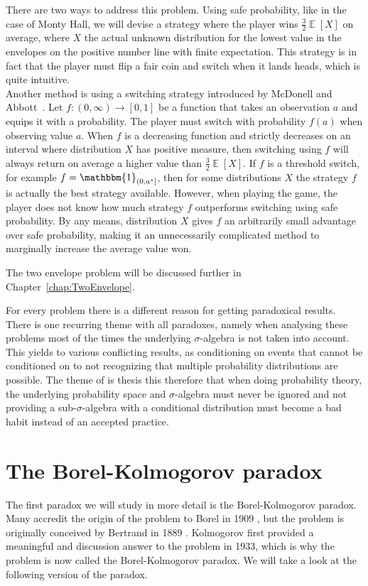 \documentclass[a4paper]{report}
\theoremstyle{plain}
\theoremstyle{definition}
\theoremstyle{remark}
\numberwithin{equation}{chapter}
\DeclareMathOperator{\E}{\mathbb{E}}
\DeclareMathOperator{\1}{\mathbbm{1}}
\begin{document}
There are two ways to address this problem. Using safe probability, like in the case of Monty Hall, we will devise a strategy where the player wins $\frac{3}{2}\E[X]$ on average, where $X$ the actual unknown distribution for the lowest value in the envelopes on the positive number line with finite expectation. This strategy is in fact that the player must flip a fair coin and switch when it lands heads, which is quite intuitive.\\
Another method is using a switching strategy introduced by McDonell and Abbott~\cite{McDonnell09,Abbott10,McDonnell11}. Let $f\colon (0,\infty)\to[0,1]$ be a function that takes an observation $a$ and equips it with a probability. The player must switch with probability $f(a)$ when observing value $a$. When $f$ is a decreasing function and strictly decreases on an interval where distribution $X$ has positive measure, then switching using $f$ will always return on average a higher value than $\frac{3}{2}\E[X]$. If $f$ is a threshold switch, for example $f=\1_{(0,a^*]}$, then for some distributions $X$ the strategy $f$ is actually the best strategy available. However, when playing the game, the player does not know how much strategy $f$ outperforms switching using safe probability. By any means, distribution $X$ gives $f$ an arbitrarily small advantage over safe probability, making it an unnecessarily complicated method to marginally increase the average value won.

The two envelope problem will be discussed further in Chapter~\ref{chap:TwoEnvelope}.

For every problem there is a different reason for getting paradoxical results. There is one recurring theme with all paradoxes, namely when analysing these problems most of the times the underlying $\sigma$-algebra is not taken into account. This yields to various conflicting results, as conditioning on events that cannot be conditioned on to not recognizing that multiple probability distributions are possible. The theme of is thesis this therefore that when doing probability theory, the underlying probability space and $\sigma$-algebra must never be ignored and not providing a sub-$\sigma$-algebra with a conditional distribution must become a bad habit instead of an accepted practice.

\chapter{The Borel-Kolmogorov paradox}\label{chap:BorelKolmogorov}
The first paradox we will study in more detail is the Borel-Kolmogorov paradox. Many accredit the origin of the problem to Borel in 1909 \cite{Borel09}, but the problem is originally conceived by Bertrand in 1889 \cite{Bertrand89}. Kolmogorov \cite{Kolmogorov33} first provided a meaningful and discussion answer to the problem in 1933, which is why the problem is now called the Borel-Kolmogorov paradox. We will take a look at the following version of the paradox.
\end{document}
